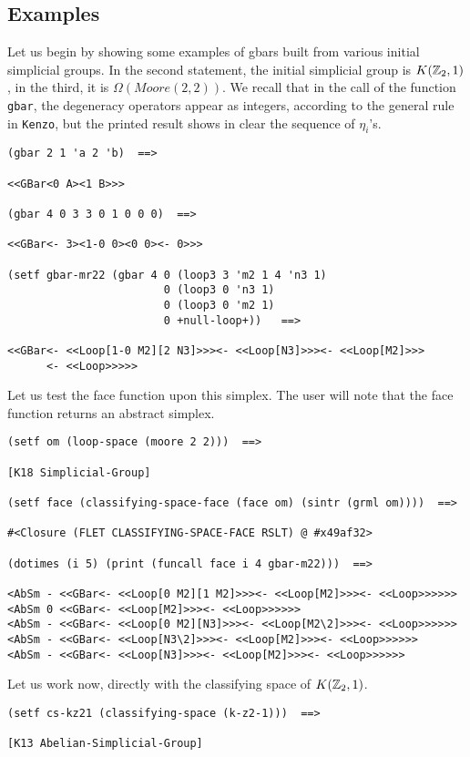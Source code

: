 \subsection* {Examples}

Let us begin by showing some examples of gbars built  from various
initial simplicial groups. In the second statement, the initial simplicial group
is $K({\mathbb{Z}}_2, 1)$, in the third, it is $\Omega({\mathit Moore}(2,2))$. We recall that
in the call of the function {\tt gbar}, the degeneracy operators appear as integers,
according to the general rule in {\tt Kenzo}, but the printed result shows in clear
the sequence of $\eta_i$'s.
{\footnotesize\begin{verbatim}
(gbar 2 1 'a 2 'b)  ==>

<<GBar<0 A><1 B>>>

(gbar 4 0 3 3 0 1 0 0 0)  ==>

<<GBar<- 3><1-0 0><0 0><- 0>>>

(setf gbar-mr22 (gbar 4 0 (loop3 3 'm2 1 4 'n3 1)
                        0 (loop3 0 'n3 1)
                        0 (loop3 0 'm2 1)
                        0 +null-loop+))   ==>

<<GBar<- <<Loop[1-0 M2][2 N3]>>><- <<Loop[N3]>>><- <<Loop[M2]>>>
      <- <<Loop>>>>>
\end{verbatim}}
Let us test the face function upon this simplex. The user will note
that the face function returns an abstract simplex.
{\footnotesize\begin{verbatim}
(setf om (loop-space (moore 2 2)))  ==>

[K18 Simplicial-Group]

(setf face (classifying-space-face (face om) (sintr (grml om))))  ==>

#<Closure (FLET CLASSIFYING-SPACE-FACE RSLT) @ #x49af32>

(dotimes (i 5) (print (funcall face i 4 gbar-m22)))  ==>

<AbSm - <<GBar<- <<Loop[0 M2][1 M2]>>><- <<Loop[M2]>>><- <<Loop>>>>>>
<AbSm 0 <<GBar<- <<Loop[M2]>>><- <<Loop>>>>>>
<AbSm - <<GBar<- <<Loop[0 M2][N3]>>><- <<Loop[M2\2]>>><- <<Loop>>>>>>
<AbSm - <<GBar<- <<Loop[N3\2]>>><- <<Loop[M2]>>><- <<Loop>>>>>>
<AbSm - <<GBar<- <<Loop[N3]>>><- <<Loop[M2]>>><- <<Loop>>>>>>
\end{verbatim}}
Let us work now, directly with the classifying space of $K({\mathbb{Z}}_2, 1)$.
{\footnotesize\begin{verbatim}
(setf cs-kz21 (classifying-space (k-z2-1)))  ==>

[K13 Abelian-Simplicial-Group]
\end{verbatim}}
